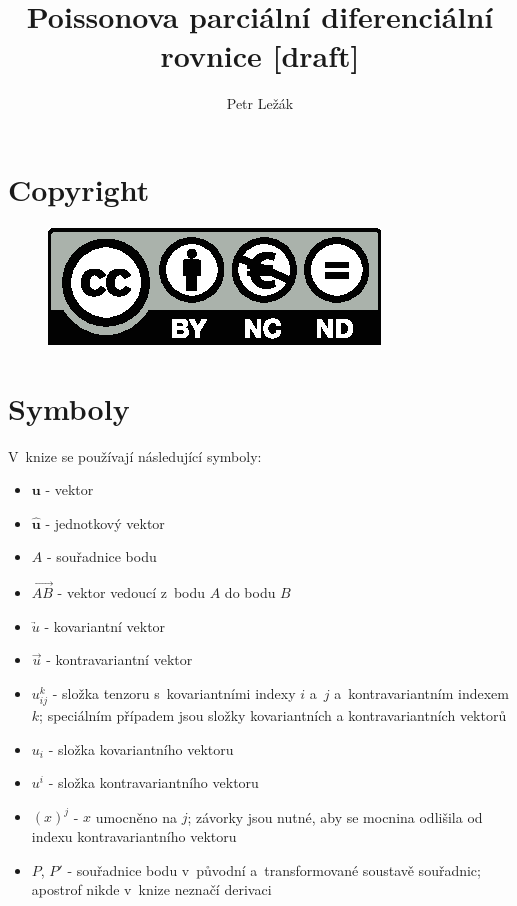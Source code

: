 \documentclass{book}
\title{Poissonova parciální diferenciální rovnice [draft]}
\author{Petr Ležák}
\newcommand{\vect}[1]{\boldsymbol{#1}}
\newcommand{\unitvect}[1]{\hat{\boldsymbol{#1}}}
\newcommand{\vectpoints}[1]{\overrightarrow{#1}}
\newcommand{\kovarvect}[1]{\underrightarrow{#1}}
\newcommand{\kontravect}[1]{\overrightarrow{#1}}
\begin{document}
\maketitle

\tableofcontents

\chapter{Copyright}



\begin{figure}
	\includegraphics{pic/by-nc-nd-eu.eps}
\end{figure}

\chapter{Symboly}

V~knize se používají následující symboly:
\begin{itemize}
\item \(\vect{u}\) - vektor
\item \(\unitvect{u}\) - jednotkový vektor
\item \(A\) - souřadnice bodu
\item \(\vectpoints{AB}\) - vektor vedoucí z~bodu \(A\) do bodu \(B\)
\item \(\kovarvect{u}\) - kovariantní vektor
\item \(\kontravect{u}\) - kontravariantní vektor
\item \(u_{ij}^k\) - složka tenzoru s~kovariantními indexy \(i\) a~\(j\) a~kontravariantním indexem \(k\); speciálním případem jsou složky kovariantních a kontravariantních vektorů
\item \(u_i\) - složka kovariantního vektoru
\item \(u^i\) - složka kontravariantního vektoru
\item \((x)^j\) - \(x\) umocněno na \(j\); závorky jsou nutné, aby se mocnina odlišila od indexu kontravariantního vektoru
\item \(P\), \(P'\) - souřadnice bodu v~původní a~transformované soustavě souřadnic; apostrof nikde v~knize neznačí derivaci
\end{itemize}
\end{document}
